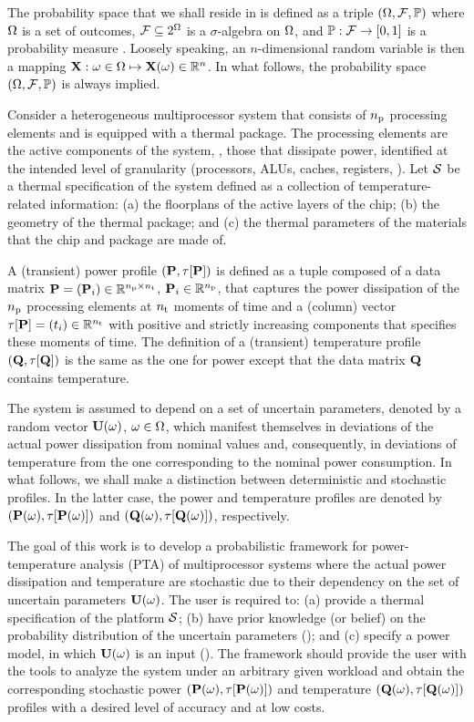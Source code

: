 
The probability space that we shall reside in is defined as a triple $(\Omega, \mathcal{F}, \mathbb{P})$ where $\Omega$ is a set of outcomes, $\mathcal{F} \subseteq 2^\Omega$ is a $\sigma$-algebra on $\Omega$, and $\mathbb{P}: \mathcal{F} \to [0, 1]$ is a probability measure \cite{maitre2010}.
Loosely speaking, an $n$-dimensional random variable is then a mapping $\mathbf{X}: \omega \in \Omega \mapsto \mathbf{X}(\omega) \in \mathbb{R}^n$.
In what follows, the probability space $(\Omega, \mathcal{F}, \mathbb{P})$ is always implied.

Consider a heterogeneous multiprocessor system that consists of ${n_\text{p}}$ processing elements and is equipped with a thermal package.
The processing elements are the active components of the system, \ie, those that dissipate power, identified at the intended level of granularity (processors, ALUs, caches, registers, \etc).
Let $\mathcal{S}$ be a thermal specification of the system defined as a collection of temperature-related information: (a) the floorplans of the active layers of the chip; (b) the geometry of the thermal package; and (c) the thermal parameters of the materials that the chip and package are made of.

A (transient) power profile $\profileP$ is defined as a tuple composed of a data matrix $\mP = (\vP_i) \in \real^{\nprocs \times \nsteps}$, $\mathbf{P}_i \in \mathbb{R}^{n_\text{p}}$, that captures the power dissipation of the ${n_\text{p}}$ processing elements at ${n_\text{t}}$ moments of time and a (column) vector $\partition{\mP} = (\t_i) \in \real^{\nsteps}$ with positive and strictly increasing components that specifies these moments of time.
The definition of a (transient) temperature profile $\profileT$ is the same as the one for power except that the data matrix $\mTO$ contains temperature.

The system is assumed to depend on a set of uncertain parameters, denoted by a random vector $\mathbf{U}(\omega)$, $\omega \in \Omega$, which manifest themselves in deviations of the actual power dissipation from nominal values and, consequently, in deviations of temperature from the one corresponding to the nominal power consumption.
In what follows, we shall make a distinction between deterministic and stochastic profiles.
In the latter case, the power and temperature profiles are denoted by $\profileP{\o}$ and $\profileT{\o}$, respectively.

The goal of this work is to develop a probabilistic framework for power-temperature analysis (PTA) of multiprocessor systems where the actual power dissipation and temperature are stochastic due to their dependency on the set of uncertain parameters $\mathbf{U}(\omega)$.
The user is required to: (a) provide a thermal specification of the platform $\mathcal{S}$; (b) have prior knowledge (or belief) on the probability distribution of the uncertain parameters (); and (c) specify a power model, in which $\mathbf{U}(\omega)$ is an input ().
The framework should provide the user with the tools to analyze the system under an arbitrary given workload and obtain the corresponding stochastic power $\profileP{\o}$ and temperature $\profileT{\o}$ profiles with a desired level of accuracy and at low costs.
